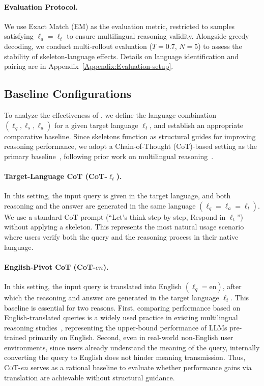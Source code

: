 \paragraph{Evaluation Protocol.} 
We use Exact Match (EM) as the evaluation metric, restricted to samples satisfying $\ell_a=\ell_t$ to ensure multilingual reasoning validity. Alongside greedy decoding, we conduct multi-rollout evaluation ($T{=}0.7$, $N{=}5$) to assess the stability of skeleton-language effects. Details on language identification and pairing are in Appendix~\ref{Appendix:Evaluation-setup}.

\subsection{Baseline Configurations}
To analyze the effectiveness of \Lasef, we define the language combination $(\ell_q, \ell_s, \ell_a)$ for a given target language $\ell_t$, and establish an appropriate comparative baseline. Since skeletons function as structural guides for improving reasoning performance, we adopt a Chain-of-Thought (CoT)-based setting as the primary baseline~\citep{cot-neurips2022}, following prior work on multilingual reasoning~\citep{xlt-emnlp2023,clp-emnlp2023}.

\paragraph{Target-Language CoT (\textsc{CoT-$\ell_t$}).} In this setting, the input query is given in the target language, and both reasoning and the answer are generated in the same language $(\ell_q=\ell_a=\ell_t)$. We use a standard CoT prompt (``Let’s think step by step, Respond in {$\ell_t$}'') without applying a skeleton. This represents the most natural usage scenario where users verify both the query and the reasoning process in their native language.

\paragraph{English-Pivot CoT (\textsc{CoT-$en$}).} In this setting, the input query is translated into English $(\ell_q=\text{en})$, after which the reasoning and answer are generated in the target language $\ell_t$. This baseline is essential for two reasons. First, comparing performance based on English-translated queries is a widely used practice in existing multilingual reasoning studies~\citep{clp-emnlp2023,xlt-emnlp2023,trans-allneed-2025naacl}, representing the upper-bound performance of LLMs pre-trained primarily on English. Second, even in real-world non-English user environments, since users already understand the meaning of the query, internally converting the query to English does not hinder meaning transmission. Thus, \textsc{CoT-$en$} serves as a rational baseline to evaluate whether performance gains via translation are achievable without structural guidance.

